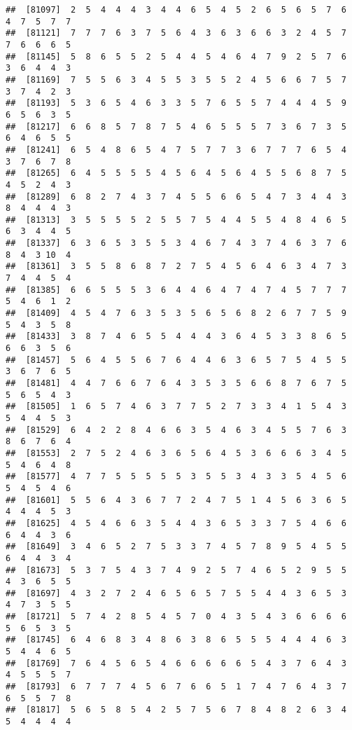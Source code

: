 \documentclass[
]{book}
\begin{document}
\begin{verbatim}
##  [81097]  2  5  4  4  4  3  4  4  6  5  4  5  2  6  5  6  5  7  6  4  7  5  7  7
##  [81121]  7  7  7  6  3  7  5  6  4  3  6  3  6  6  3  2  4  5  7  7  6  6  6  5
##  [81145]  5  8  6  5  5  2  5  4  4  5  4  6  4  7  9  2  5  7  6  3  6  4  4  3
##  [81169]  7  5  5  6  3  4  5  5  3  5  5  2  4  5  6  6  7  5  7  3  7  4  2  3
##  [81193]  5  3  6  5  4  6  3  3  5  7  6  5  5  7  4  4  4  5  9  6  5  6  3  5
##  [81217]  6  6  8  5  7  8  7  5  4  6  5  5  5  7  3  6  7  3  5  6  4  6  5  5
##  [81241]  6  5  4  8  6  5  4  7  5  7  7  3  6  7  7  7  6  5  4  3  7  6  7  8
##  [81265]  6  4  5  5  5  5  4  5  6  4  5  6  4  5  5  6  8  7  5  4  5  2  4  3
##  [81289]  6  8  2  7  4  3  7  4  5  5  6  6  5  4  7  3  4  4  3  8  4  4  4  3
##  [81313]  3  5  5  5  5  2  5  5  7  5  4  4  5  5  4  8  4  6  5  6  3  4  4  5
##  [81337]  6  3  6  5  3  5  5  3  4  6  7  4  3  7  4  6  3  7  6  8  4  3 10  4
##  [81361]  3  5  5  8  6  8  7  2  7  5  4  5  6  4  6  3  4  7  3  7  4  4  5  4
##  [81385]  6  6  5  5  5  3  6  4  4  6  4  7  4  7  4  5  7  7  7  5  4  6  1  2
##  [81409]  4  5  4  7  6  3  5  3  5  6  5  6  8  2  6  7  7  5  9  5  4  3  5  8
##  [81433]  3  8  7  4  6  5  5  4  4  4  3  6  4  5  3  3  8  6  5  6  6  3  5  6
##  [81457]  5  6  4  5  5  6  7  6  4  4  6  3  6  5  7  5  4  5  5  3  6  7  6  5
##  [81481]  4  4  7  6  6  7  6  4  3  5  3  5  6  6  8  7  6  7  5  5  6  5  4  3
##  [81505]  1  6  5  7  4  6  3  7  7  5  2  7  3  3  4  1  5  4  3  5  4  4  5  3
##  [81529]  6  4  2  2  8  4  6  6  3  5  4  6  3  4  5  5  7  6  3  8  6  7  6  4
##  [81553]  2  7  5  2  4  6  3  6  5  6  4  5  3  6  6  6  3  4  5  5  4  6  4  8
##  [81577]  4  7  7  5  5  5  5  5  3  5  5  3  4  3  3  5  4  5  6  5  4  5  4  6
##  [81601]  5  5  6  4  3  6  7  7  2  4  7  5  1  4  5  6  3  6  5  4  4  4  5  3
##  [81625]  4  5  4  6  6  3  5  4  4  3  6  5  3  3  7  5  4  6  6  6  4  4  3  6
##  [81649]  3  4  6  5  2  7  5  3  3  7  4  5  7  8  9  5  4  5  5  6  4  4  3  4
##  [81673]  5  3  7  5  4  3  7  4  9  2  5  7  4  6  5  2  9  5  5  4  3  6  5  5
##  [81697]  4  3  2  7  2  4  6  5  6  5  7  5  5  4  4  3  6  5  3  4  7  3  5  5
##  [81721]  5  7  4  2  8  5  4  5  7  0  4  3  5  4  3  6  6  6  6  5  6  5  3  5
##  [81745]  6  4  6  8  3  4  8  6  3  8  6  5  5  5  4  4  4  6  3  5  4  4  6  5
##  [81769]  7  6  4  5  6  5  4  6  6  6  6  6  5  4  3  7  6  4  3  4  5  5  5  7
##  [81793]  6  7  7  7  4  5  6  7  6  6  5  1  7  4  7  6  4  3  7  6  5  5  7  8
##  [81817]  5  6  5  8  5  4  2  5  7  5  6  7  8  4  8  2  6  3  4  5  4  4  4  4

\end{verbatim}
\end{document}
